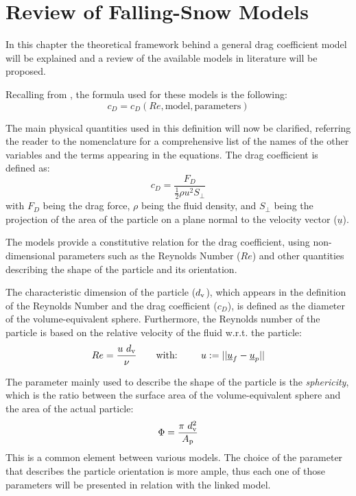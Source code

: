 
\chapter{Review of Falling-Snow Models}
\label{ch: Review}
	In this chapter the theoretical framework behind a general drag coefficient model will be explained and a review of the available models in literature will be proposed. 
	
	Recalling from , the formula used for these models is the following:
	\begin{equation}
		c_D = c_D(Re, \text{model}, \text{parameters})
	\end{equation}
	
	The main physical quantities used in this definition will now be clarified, referring the reader to the nomenclature for a comprehensive list of the names of the other variables and the terms appearing in the equations.
	The drag coefficient is defined as:
	\begin{equation}
		c_D = \dfrac{F_D}{\frac{1}{2} \rho u^2 S_{\perp}}
	\end{equation}
	with $ F_D $ being the drag force, $ \rho $ being the fluid density, and $ S_{\perp} $ being the projection of the area of the particle on a plane normal to the velocity vector ($ \underline{u} $).
	
	The models provide a constitutive relation for the drag coefficient, using non-dimensional parameters such as the Reynolds Number ($ Re $) and other quantities describing the shape of the particle and its orientation.
	 
	The characteristic dimension of the particle ($ d_{\textup{v}} $), which appears in the definition of the Reynolds Number and the drag coefficient ($ c_D $), is defined as the diameter of the volume-equivalent sphere. Furthermore, the Reynolds number of the particle is based on the relative velocity of the fluid w.r.t. the particle:
	\begin{equation}
		Re = \dfrac{u \ d_{\textup{v}}}{\nu} \qquad \text{with: } \qquad u := || \underline{u}_f - \underline{u}_p ||
	\end{equation}

	The parameter mainly used to describe the shape of the particle is the \textit{sphericity}, which is the ratio between the surface area of the
	volume-equivalent sphere and the area of the actual particle:
	\begin{equation}
		\Phi = \dfrac{\pi \ d_{\textup{v}}^2} {A_{\textup{p}}}
	\end{equation}
	This is a common element between various models. The choice of the parameter that describes the particle orientation is more ample, thus each one of those parameters will be presented in relation with the linked model.
	
